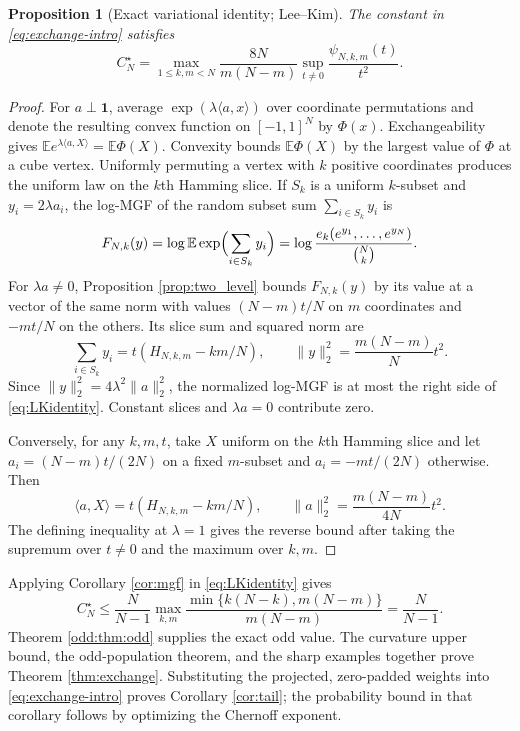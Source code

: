\documentclass[11pt,a4paper]{article}
\newtheorem{proposition}[theorem]{Proposition}
\newcommand{\E}{\mathbb E}\newcommand{\R}{\mathbb R}\newcommand{\N}{\mathbb N}\newcommand{\one}{\mathbf1}
\begin{document}
\begin{proposition}[Exact variational identity; Lee--Kim]\label{prop:variational}
The constant in \eqref{eq:exchange-intro} satisfies
\begin{equation}\label{eq:LKidentity}
 \boxed{\quad C_N^\star=
 \max_{1\le k,m<N}\frac{8N}{m(N-m)}
 \sup_{t\ne0}\frac{\psi_{N,k,m}(t)}{t^2}.\quad}
\end{equation}
\end{proposition}
\begin{proof}
For $a\perp\one$, average $\exp(\lambda\langle a,x\rangle)$ over coordinate permutations and denote the resulting convex function on $[-1,1]^N$ by $\Phi(x)$. Exchangeability gives $\E e^{\lambda\langle a,X\rangle}=\E\Phi(X)$. Convexity bounds $\E\Phi(X)$ by the largest value of $\Phi$ at a cube vertex. Uniformly permuting a vertex with $k$ positive coordinates produces the uniform law on the $k$th Hamming slice. If $S_k$ is a uniform $k$-subset and $y_i=2\lambda a_i$, the log-MGF of the random subset sum $\sum_{i\in S_k}y_i$ is
\[
 F_{N,k}(y)=\log\E\exp\Bigl(\sum_{i\in S_k}y_i\Bigr)
 =\log\frac{e_k(e^{y_1},\ldots,e^{y_N})}{\binom Nk}.
\]
For $\lambda a\ne0$, Proposition \ref{prop:two_level} bounds $F_{N,k}(y)$ by its value at a vector of the same norm with values $(N-m)t/N$ on $m$ coordinates and $-mt/N$ on the others. Its slice sum and squared norm are
\[
 \sum_{i\in S_k}y_i=t(H_{N,k,m}-km/N),\qquad
 \|y\|_2^2=\frac{m(N-m)}N t^2.
\]
Since $\|y\|_2^2=4\lambda^2\|a\|_2^2$, the normalized log-MGF is at most the right side of \eqref{eq:LKidentity}. Constant slices and $\lambda a=0$ contribute zero.

Conversely, for any $k,m,t$, take $X$ uniform on the $k$th Hamming slice and let $a_i=(N-m)t/(2N)$ on a fixed $m$-subset and $a_i=-mt/(2N)$ otherwise. Then
\[
 \langle a,X\rangle=t(H_{N,k,m}-km/N),\qquad
 \|a\|_2^2=\frac{m(N-m)}{4N}t^2.
\]
The defining inequality at $\lambda=1$ gives the reverse bound after taking the supremum over $t\ne0$ and the maximum over $k,m$.
\end{proof}

Applying Corollary \ref{cor:mgf} in \eqref{eq:LKidentity} gives
\begin{equation}\label{eq:globalC}
 C_N^\star\le\frac{N}{N-1}
 \max_{k,m}\frac{\min\{k(N-k),m(N-m)\}}{m(N-m)}
 =\frac{N}{N-1}.
\end{equation}
Theorem \ref{odd:thm:odd} supplies the exact odd value. The curvature upper bound, the odd-population theorem, and the sharp examples together prove Theorem \ref{thm:exchange}. Substituting the projected, zero-padded weights into \eqref{eq:exchange-intro} proves Corollary \ref{cor:tail}; the probability bound in that corollary follows by optimizing the Chernoff exponent.
\end{document}
